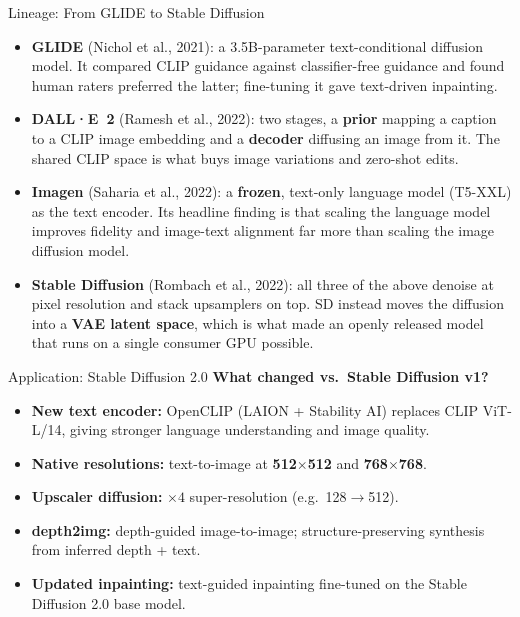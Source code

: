 \begin{frame}{Lineage: From GLIDE to Stable Diffusion}
  \begin{itemize}\itemsep0.3em
    \item \textbf{GLIDE} (Nichol et al., 2021): a 3.5B-parameter text-conditional diffusion model. It compared CLIP guidance against classifier-free guidance and found human raters preferred the latter; fine-tuning it gave text-driven inpainting.
    \item \textbf{DALL·E~2} (Ramesh et al., 2022): two stages, a \textbf{prior} mapping a caption to a CLIP image embedding and a \textbf{decoder} diffusing an image from it. The shared CLIP space is what buys image variations and zero-shot edits.
    \item \textbf{Imagen} (Saharia et al., 2022): a \textbf{frozen}, text-only language model (T5-XXL) as the text encoder. Its headline finding is that scaling the language model improves fidelity and image-text alignment far more than scaling the image diffusion model.
    \item \textbf{Stable Diffusion} (Rombach et al., 2022): all three of the above denoise at pixel resolution and stack upsamplers on top. SD instead moves the diffusion into a \textbf{VAE latent space}, which is what made an openly released model that runs on a single consumer GPU possible.
  \end{itemize}
\end{frame}

\begin{frame}{Application: Stable Diffusion 2.0}
  \footnotesize
  \textbf{What changed vs.\ Stable Diffusion v1?}
  \begin{itemize}\itemsep0.3em
    \item \textbf{New text encoder:} OpenCLIP (LAION + Stability AI) replaces CLIP ViT-L/14, giving stronger language understanding and image quality.
    \item \textbf{Native resolutions:} text-to-image at \textbf{512$\times$512} and \textbf{768$\times$768}.
    \item \textbf{Upscaler diffusion:} $\times 4$ super-resolution (e.g.\ 128$\rightarrow$512).
    \item \textbf{depth2img:} depth-guided image-to-image; structure-preserving synthesis from inferred depth + text.
    \item \textbf{Updated inpainting:} text-guided inpainting fine-tuned on the Stable Diffusion 2.0 base model.
  \end{itemize}
\end{frame}

